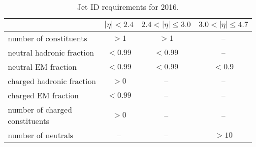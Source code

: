 \begin{table}[ht]
    \centering
    \setlength{\tabcolsep}{0.8em}
    \renewcommand{\arraystretch}{1.25}
    \caption{Jet ID requirements for 2016.}
    \label{tab:analysis:selection:jet_id_2016}
    \begin{tabular}{l|ccc}
        \hline
                                    & $|\eta| < 2.4$ & $2.4 < |\eta| \leq 3.0$ & $3.0 < |\eta| \leq 4.7$ \\
        \hline                                                                   
        number of constituents         & $> 1$          & $> 1$                  & -- \\
        neutral hadronic fraction      & $< 0.99$       & $< 0.99$               & -- \\
        neutral EM fraction            & $< 0.99$       & $< 0.99$               & $<0.9$ \\
        charged hadronic fraction      & $> 0$          & --                     & -- \\
        charged EM fraction            & $< 0.99$       & --                     & -- \\
        number of charged constituents & $> 0$          & --                     & -- \\
        number of neutrals             & --             & --                     & $>10$                   \\
        \hline
    \end{tabular}
\end{table}